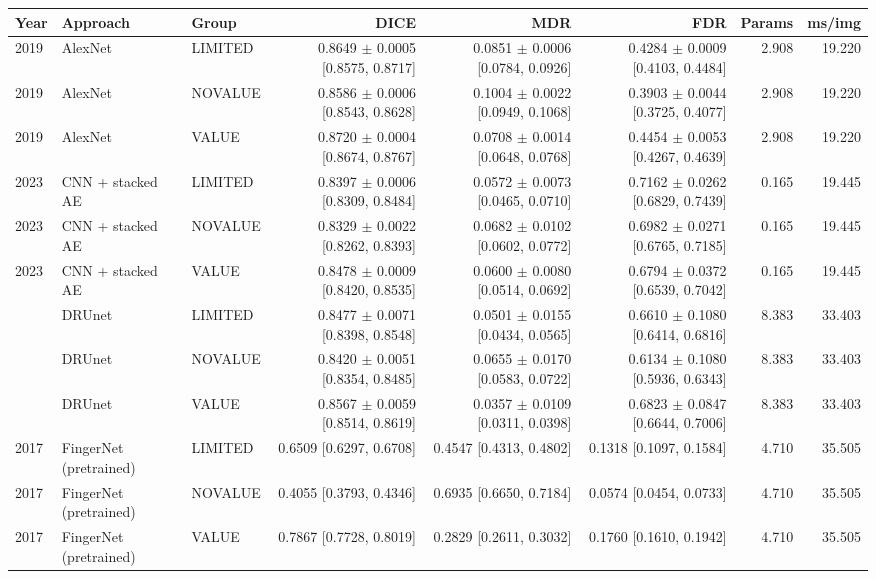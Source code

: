 \begin{table}[t]
\centering
\small
\begin{tabular}{lllrrrrr}
\toprule
Year & Approach & Group & DICE & MDR & FDR & Params & ms/img \\
\midrule
2019 & AlexNet & LIMITED & 0.8649 $\pm$ 0.0005 [0.8575, 0.8717] & 0.0851 $\pm$ 0.0006 [0.0784, 0.0926] & 0.4284 $\pm$ 0.0009 [0.4103, 0.4484] & 2.908 & 19.220 \\
2019 & AlexNet & NOVALUE & 0.8586 $\pm$ 0.0006 [0.8543, 0.8628] & 0.1004 $\pm$ 0.0022 [0.0949, 0.1068] & 0.3903 $\pm$ 0.0044 [0.3725, 0.4077] & 2.908 & 19.220 \\
2019 & AlexNet & VALUE & 0.8720 $\pm$ 0.0004 [0.8674, 0.8767] & 0.0708 $\pm$ 0.0014 [0.0648, 0.0768] & 0.4454 $\pm$ 0.0053 [0.4267, 0.4639] & 2.908 & 19.220 \\
2023 & CNN + stacked AE & LIMITED & 0.8397 $\pm$ 0.0006 [0.8309, 0.8484] & 0.0572 $\pm$ 0.0073 [0.0465, 0.0710] & 0.7162 $\pm$ 0.0262 [0.6829, 0.7439] & 0.165 & 19.445 \\
2023 & CNN + stacked AE & NOVALUE & 0.8329 $\pm$ 0.0022 [0.8262, 0.8393] & 0.0682 $\pm$ 0.0102 [0.0602, 0.0772] & 0.6982 $\pm$ 0.0271 [0.6765, 0.7185] & 0.165 & 19.445 \\
2023 & CNN + stacked AE & VALUE & 0.8478 $\pm$ 0.0009 [0.8420, 0.8535] & 0.0600 $\pm$ 0.0080 [0.0514, 0.0692] & 0.6794 $\pm$ 0.0372 [0.6539, 0.7042] & 0.165 & 19.445 \\
 & DRUnet & LIMITED & 0.8477 $\pm$ 0.0071 [0.8398, 0.8548] & 0.0501 $\pm$ 0.0155 [0.0434, 0.0565] & 0.6610 $\pm$ 0.1080 [0.6414, 0.6816] & 8.383 & 33.403 \\
 & DRUnet & NOVALUE & 0.8420 $\pm$ 0.0051 [0.8354, 0.8485] & 0.0655 $\pm$ 0.0170 [0.0583, 0.0722] & 0.6134 $\pm$ 0.1080 [0.5936, 0.6343] & 8.383 & 33.403 \\
 & DRUnet & VALUE & 0.8567 $\pm$ 0.0059 [0.8514, 0.8619] & 0.0357 $\pm$ 0.0109 [0.0311, 0.0398] & 0.6823 $\pm$ 0.0847 [0.6644, 0.7006] & 8.383 & 33.403 \\
2017 & FingerNet (pretrained) & LIMITED & 0.6509 [0.6297, 0.6708] & 0.4547 [0.4313, 0.4802] & 0.1318 [0.1097, 0.1584] & 4.710 & 35.505 \\
2017 & FingerNet (pretrained) & NOVALUE & 0.4055 [0.3793, 0.4346] & 0.6935 [0.6650, 0.7184] & 0.0574 [0.0454, 0.0733] & 4.710 & 35.505 \\
2017 & FingerNet (pretrained) & VALUE & 0.7867 [0.7728, 0.8019] & 0.2829 [0.2611, 0.3032] & 0.1760 [0.1610, 0.1942] & 4.710 & 35.505 \\

\end{tabular}
\end{table}
